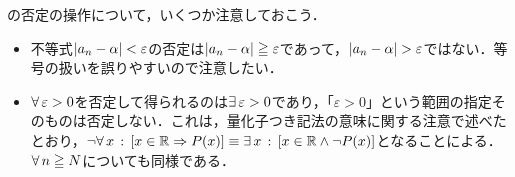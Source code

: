 \begin{remark}[否定をとるときの注意]
  の否定の操作について，いくつか注意しておこう．
  \begin{itemize}
    \item 不等式$\lvert a_n - \alpha\rvert < \varepsilon$の否定は$\lvert a_n - \alpha\rvert \geqq \varepsilon$であって，$\lvert a_n - \alpha\rvert > \varepsilon$ではない．等号の扱いを誤りやすいので注意したい．
    \item $\forall\, \varepsilon > 0$を否定して得られるのは$\exists\, \varepsilon > 0$であり，「$\varepsilon > 0$」という範囲の指定そのものは否定しない．これは，量化子つき記法の意味に関する注意で述べたとおり，$\lnot \forall\, x \,:\, [ x \in \mathbb{R} \mathrel{\Rightarrow} P(x) ] \equiv \exists\, x \,:\, [ x \in \mathbb{R} \land \lnot P(x) ]$となることによる．$\forall\, n \geqq N$についても同様である．
  \end{itemize}
\end{remark}
